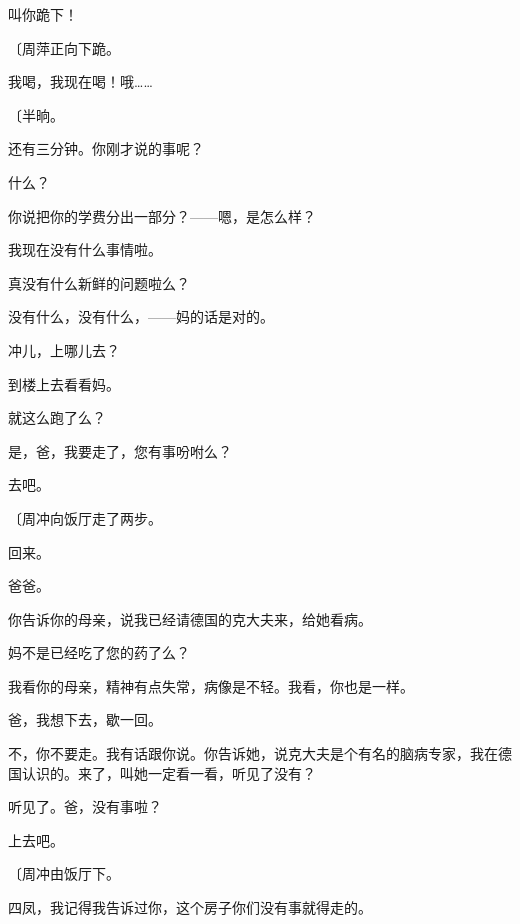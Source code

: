 叫你跪下！

{\fangsong〔周萍正向下跪。}

我喝，我现在喝！哦……

{\fangsong〔半晌。}

还有三分钟。你刚才说的事呢？

什么？

你说把你的学费分出一部分？——嗯，是怎么样？

我现在没有什么事情啦。

真没有什么新鲜的问题啦么？

没有什么，没有什么，——妈的话是对的。

冲儿，上哪儿去？

到楼上去看看妈。

就这么跑了么？

是，爸，我要走了，您有事吩咐么？

去吧。

{\fangsong〔周冲向饭厅走了两步。}

回来。

爸爸。

你告诉你的母亲，说我已经请德国的克大夫来，给她看病。

妈不是已经吃了您的药了么？

我看你的母亲，精神有点失常，病像是不轻。我看，你也是一样。

爸，我想下去，歇一回。

不，你不要走。我有话跟你说。你告诉她，说克大夫是个有名的脑病专家，我在德国认识的。来了，叫她一定看一看，听见了没有？

听见了。爸，没有事啦？

上去吧。

{\fangsong〔周冲由饭厅下。}

四凤，我记得我告诉过你，这个房子你们没有事就得走的。

